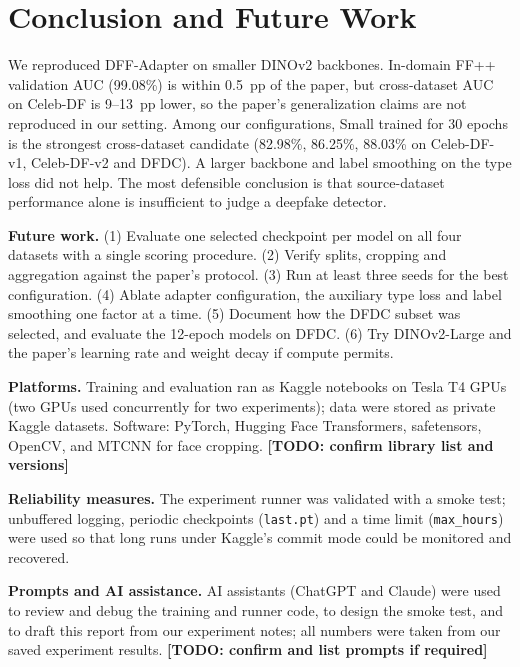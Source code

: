 \documentclass[lettersize,journal]{IEEEtran}
\newcommand{\todo}[1]{\textbf{[TODO: #1]}}
\begin{document}
\section{Conclusion and Future Work}
We reproduced DFF-Adapter on smaller DINOv2 backbones. In-domain FF++ validation AUC (99.08\%) is within 0.5~pp of the paper, but cross-dataset AUC on Celeb-DF is 9--13~pp lower, so the paper's generalization claims are not reproduced in our setting. Among our configurations, Small trained for 30 epochs is the strongest cross-dataset candidate (82.98\%, 86.25\%, 88.03\% on Celeb-DF-v1, Celeb-DF-v2 and DFDC). A larger backbone and label smoothing on the type loss did not help. The most defensible conclusion is that source-dataset performance alone is insufficient to judge a deepfake detector.

\textbf{Future work.} (1) Evaluate one selected checkpoint per model on all four datasets with a single scoring procedure. (2) Verify splits, cropping and aggregation against the paper's protocol. (3) Run at least three seeds for the best configuration. (4) Ablate adapter configuration, the auxiliary type loss and label smoothing one factor at a time. (5) Document how the DFDC subset was selected, and evaluate the 12-epoch models on DFDC. (6) Try DINOv2-Large and the paper's learning rate and weight decay if compute permits.




{\appendix
\textbf{Platforms.} Training and evaluation ran as Kaggle notebooks on Tesla T4 GPUs (two GPUs used concurrently for two experiments); data were stored as private Kaggle datasets. Software: PyTorch, Hugging Face Transformers, safetensors, OpenCV, and MTCNN for face cropping. \todo{confirm library list and versions}

\textbf{Reliability measures.} The experiment runner was validated with a smoke test; unbuffered logging, periodic checkpoints (\texttt{last.pt}) and a time limit (\texttt{max\_hours}) were used so that long runs under Kaggle's commit mode could be monitored and recovered.

\textbf{Prompts and AI assistance.} AI assistants (ChatGPT and Claude) were used to review and debug the training and runner code, to design the smoke test, and to draft this report from our experiment notes; all numbers were taken from our saved experiment results. \todo{confirm and list prompts if required}
}
\end{document}
